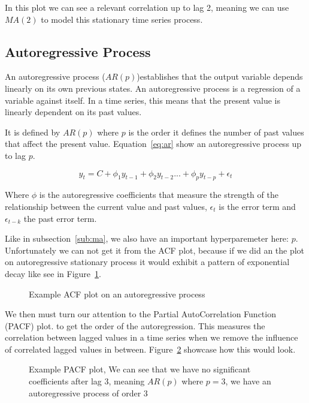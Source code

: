 \documentclass[journal]{IEEEtran}
\begin{document}
In this plot we can see a relevant correlation up to lag 2, meaning we can use
$MA(2)$ to model this stationary time series process.

\subsection{Autoregressive Process}\label{sub:ar}

An autoregressive process ($AR(p)$)establishes that the output variable
depends linearly on its own previous states. An autoregressive process is a
regression of a variable against itself. In a time series, this means that the
present value is linearly dependent on its past values. \cite{timeseries}

It is defined by $AR(p)$ where $p$ is the order it defines the number of past
values that affect the present value. Equation~\ref{eq:ar} show an
autoregressive process up to lag $p$.

\begin{equation}
    y_t = C + \phi_1 y_{t-1} + \phi_2 y_{t-2}
            ... +  \phi_p y_{t-p} + \epsilon_t
    \label{eq:ar}
\end{equation}

Where $\phi$ is the autoregressive coefficients that measure the strength of
the relationship between the current value and past values, $\epsilon_t$ is
the error term and $\epsilon_{t-k}$ the past error term.

Like in subsection~\ref{sub:ma}, we also have an important hyperparemeter
here: $p$. Unfortunately we can not get it from the ACF plot, because if we
did an the plot on autoregressive stationary process it would exhibit a
pattern of exponential decay\cite{timeseries} like see in
Figure~\ref{fig:acf-ar}.

\begin{figure}[htbp]
  \centering
  
    \caption{Example ACF plot on an autoregressive process}
  \label{fig:acf-ar}
\end{figure}

We then must turn our attention to the Partial AutoCorrelation Function (PACF)
plot. to get the order of the autoregression. This measures the correlation
between lagged values in a time series when we remove the influence of
correlated lagged values in between. Figure~\ref{fig:pacf} showcase how this
would look.

\begin{figure}[htbp]
  \centering
  
    \caption{Example PACF plot, We can see that we have no significant
        coefficients after lag 3, meaning $AR(p)$ where $p=3$, we have an
        autoregressive process of order 3}
    \label{fig:pacf}
\end{figure}
\end{document}
